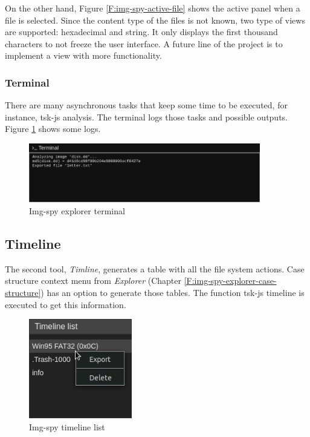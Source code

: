 On the other hand, Figure \ref{F:img-spy-active-file} shows the active panel
when a file is selected. Since the content type of the files is not known,
two type of views are supported: hexadecimal and string. It only displays
the first thousand characters to not freeze the user interface. A future line
of the project is to implement a view with more functionality.

\subsubsection{Terminal}

There are many asynchronous tasks that keep some time to be executed, for 
instance, tsk-js analysis. The terminal logs those tasks and possible outputs.
Figure \ref{F:img-spy-explorer-terminal} shows some logs.


\begin{figure}[htb]
	\begin{center}
		\includegraphics[width=0.9\textwidth]
		{./figures/explorer-terminal.png}
		\caption{Img-spy explorer terminal}
		\label{F:img-spy-explorer-terminal}
	\end{center}
\end{figure}

\subsection{Timeline}
\label{S:timeline}

The second tool, \textit{Timline}, generates a table with all the file system
actions. Case structure context menu from \textit{Explorer} (Chapter
\ref{F:img-spy-explorer-case-structure}) has an option to generate those
tables. The function tsk-js timeline is executed to get this information.

\begin{figure}
	\includegraphics[width=4.5cm]
	{./figures/timeline-list.png}
	\centering
	\caption{Img-spy timeline list}
	\label{F:img-spy-timeline-list}
\end{figure}

